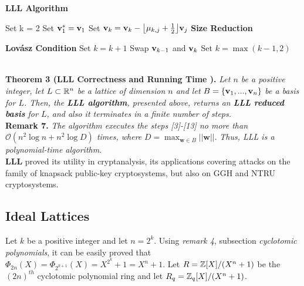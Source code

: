 \begin{tcolorbox}[colframe=black,colback=white,arc=0pt,outer arc=0pt]
	\begin{center}
		\textbf{LLL Algorithm}
	\end{center}
	\begin{algorithmic}[1]
		\State Set k = 2
		\State Set $\textbf{v}_1^* = \textbf{v}_1$
		\State Set $\textbf{v}_k = \textbf{v}_k - \big\lfloor \mu_{k,j} + \frac{1}{2} \big\rfloor \textbf{v}_j$     \Comment \textbf{Size Reduction}
		\EndFor
		
		 \Comment \textbf{Lov\'asz Condition}
		\State Set $k = k + 1$
		\Else 
		\State Swap $\textbf{v}_{k-1}$ and $\textbf{v}_k$ 
		\State Set $k=\max (k-1, 2)$
		\EndIf
		\EndWhile
	\end{algorithmic}
\end{tcolorbox}
~\\

\textbf{Theorem 3 (LLL Correctness and Running Time \cite{HPS08}).} \textit{Let $n$ be a positive integer, let $L \subset \mathbb{R}^n$ be a lattice of dimension $n$ and let} $B = \{\textbf{v}_1,...,\textbf{v}_n\}$ \textit{be a basis for $L$. Then, the \textbf{LLL algorithm}, presented above, returns an \textbf{LLL reduced basis} for $L$, and also it terminates in a finite number of steps.}\\

\textbf{Remark 7.} \textit{The algorithm executes the steps [3]-[13] no more than $\mathcal{O}(n^2 \log n + n^2 \log D)$ times, where} $D = \displaystyle{\max_{\textbf{w} \in B} ||\textbf{w}||}$. \textit{Thus, LLL is a polynomial-time algorithm}.\\

\textbf{LLL} proved its utility in cryptanalysis, its applications covering attacks on the family of knapsack public-key cryptosystems, but also on GGH and NTRU cryptosystems. 

\subsection{Ideal Lattices}

Let $k$ be a positive integer and let $n = 2 ^ k$. Using \textit{remark 4}, subsection \textit{cyclotomic polynomials}, it can be easily proved that $\Phi_{2n}(X) = \Phi_{2^{k+1}}(X) = X ^ {2^k} + 1 = X^n + 1$. Let $R = {\mathbb Z}[X] / (X^n + 1)$ be the $(2n)^{th}$ cyclotomic polynomial ring and let $R_q = {\mathbb Z}_q[X] / (X^n + 1)$.\\

